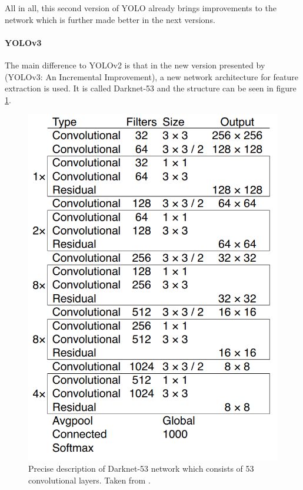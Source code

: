 All in all, this second version of YOLO already brings improvements to the network which is further made better in the next versions.


\paragraph{YOLOv3}
The main difference to YOLOv2 is that in the new version presented by \cite{yolov3} (YOLOv3: An Incremental Improvement), a new network architecture for feature extraction is used. It is called Darknet-53 and the structure can be seen in figure \ref{fig:yolov3_architecture}.\\

\begin{figure}[htb!]
	\centering
	\includegraphics[scale=0.28]{figures/yolov3_architecture.png}
	\caption{Precise description of Darknet-53 network which consists of 53 convolutional layers. Taken from \cite{yolov3}.}
	\label{fig:yolov3_architecture}
\end{figure}

